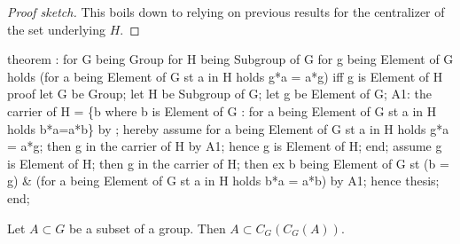 \begin{proof}[Proof sketch]
This boils down to relying on previous results for the centralizer of
the set underlying $H$.
\end{proof}

\nwenddocs{}\endmoddef\nwstartdeflinemarkup{}\nwenddeflinemarkup
theorem :
  for G being Group
  for H being Subgroup of G
  for g being Element of G
  holds (for a being Element of G st a in H holds g*a = a*g) iff
        g is Element of  H
proof
  let G be Group;
  let H be Subgroup of G;
  let g be Element of G;
A1: the carrier of  H = \{b where b is Element of G : for a
  being Element of G st a in H holds b*a=a*b\} by ;
  hereby
    assume for a being Element of G st a in H holds g*a = a*g;
    then g in the carrier of  H by A1;
    hence g is Element of  H;
  end;
  assume g is Element of  H;
  then g in the carrier of  H;
  then ex b being Element of G st (b = g) & (for a being Element of G st a in H
  holds b*a = a*b) by A1;
  hence thesis;
end;
\eatline
{}\nwendcode{}\nwdocspar
\begin{theorem}
Let $A\subset G$ be a subset of a group. Then $A\subset C_{G}(C_{G}(A))$.
\end{theorem}

